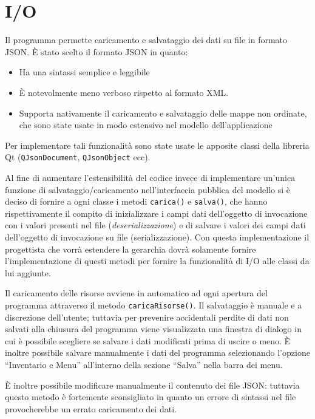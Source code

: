 \documentclass[
]{article}
\providecommand{\tightlist}{%
  \setlength{\itemsep}{0pt}\setlength{\parskip}{0pt}}
\begin{document}
\hypertarget{io}{%
\section{I/O}\label{io}}

Il programma permette caricamento e salvataggio dei dati su file in
formato JSON. È stato scelto il formato JSON in quanto:

\begin{itemize}
\tightlist
\item
  Ha una sintassi semplice e leggibile
\item
  È notevolmente meno verboso rispetto al formato XML.
\item
  Supporta nativamente il caricamento e salvataggio delle mappe non
  ordinate, che sono state usate in modo estensivo nel modello
  dell'applicazione
\end{itemize}

Per implementare tali funzionalità sono state usate le apposite classi
della libreria Qt (\texttt{QJsonDocument}, \texttt{QJsonObject} ecc).

Al fine di aumentare l'estensibilità del codice invece di implementare
un'unica funzione di salvataggio/caricamento nell'interfaccia pubblica
del modello si è deciso di fornire a ogni classe i metodi
\texttt{carica()} e \texttt{salva()}, che hanno rispettivamente il
compito di inizializzare i campi dati dell'oggetto di invocazione con i
valori presenti nel file (\emph{deserializzazione}) e di salvare i
valori dei campi dati dell'oggetto di invocazione su file
(serializzazione). Con questa implementazione il progettista che vorrà
estendere la gerarchia dovrà solamente fornire l'implementazione di
questi metodi per fornire la funzionalità di I/O alle classi da lui
aggiunte.

Il caricamento delle risorse avviene in automatico ad ogni apertura del
programma attraverso il metodo \texttt{caricaRisorse()}. Il salvataggio
è manuale e a discrezione dell'utente; tuttavia per prevenire
accidentali perdite di dati non salvati alla chiusura del programma
viene visualizzata una finestra di dialogo in cui è possibile scegliere
se salvare i dati modificati prima di uscire o meno. È inoltre possibile
salvare manualmente i dati del programma selezionando l'opzione
``Inventario e Menu'' all'interno della sezione ``Salva'' nella barra
dei menu.

È inoltre possibile modificare manualmente il contenuto dei file JSON:
tuttavia questo metodo è fortemente sconsigliato in quanto un errore di
sintassi nel file provocherebbe un errato caricamento dei dati.
\end{document}
